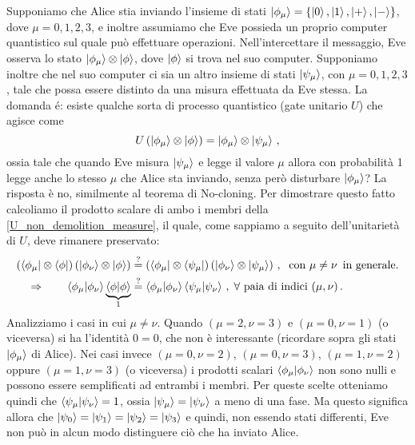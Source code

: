 \noindent Supponiamo che Alice stia inviando l'insieme di stati $\ket{\phi_\mu} = \{ \ket{0}, \ket{1}, \ket{+}, \ket{-} \}$, dove $\mu = 0, 1,2,3$, e inoltre assumiamo che Eve possieda un proprio computer quantistico sul quale può effettuare operazioni. Nell'intercettare il messaggio, Eve osserva lo stato $\ket{\phi_\mu} \otimes \ket{\phi}$, dove $\ket{\phi}$ si trova nel suo computer. Supponiamo inoltre che nel suo computer ci sia un altro insieme di stati $\ket{\psi_\mu}$, con $\mu = 0,1,2,3$, tale che possa essere distinto da una misura effettuata da Eve stessa. La domanda é: esiste qualche sorta di processo quantistico (gate unitario $U$) che agisce come
\begin{equation}\label{U_non_demolition_measure}
    U \left( \ket{\phi_\mu} \otimes \ket{\phi} \right) = \ket{\phi_\mu} \otimes \ket{\psi_\mu} \, ,
\end{equation}
ossia tale che quando Eve misura $\ket{\psi_\mu}$ e legge il valore $\mu$ allora con probabilità 1 legge anche lo stesso $\mu$ che Alice sta inviando, senza però disturbare $\ket{\phi_\mu}$? La risposta è no, similmente al teorema di No-cloning. Per dimostrare questo fatto calcoliamo il prodotto scalare di ambo i membri della \eqref{U_non_demolition_measure}, il quale, come sappiamo a seguito dell'unitarietà di $U$, deve rimanere preservato:
\begin{align*}
    \left( \bra{\phi_\mu} \otimes \bra{\phi} \right) \left( \ket{\phi_\nu} \otimes \ket{\phi} \right) &\overset{?}{=} \left( \bra{\phi_\mu} \otimes \bra{\psi_\mu} \right) \left( \ket{\phi_\nu} \otimes \ket{\psi_\mu} \right) \, , \; \text{ con } \mu \neq \nu \, \text{ in generale.} \\
    \Rightarrow \qquad \braket{\phi_\mu}{\phi_\nu} \underbrace{\braket{\phi}}_1 &\overset{?}{=} \braket{\phi_\mu}{\phi_\nu} \braket{\psi_\mu}{\psi_\nu} \, , \; \forall \text{ paia di indici } (\mu,\nu) \, .
\end{align*}
Analizziamo i casi in cui $\mu \neq \nu$. Quando $(\mu = 2, \nu = 3)$ e $(\mu = 0, \nu = 1)$ (o viceversa) si ha l'identità $0 = 0$, che non è interessante (ricordare sopra gli stati $\ket{\phi_\mu}$ di Alice). Nei casi invece $(\mu = 0, \nu = 2)$, $(\mu = 0, \nu = 3)$, $(\mu = 1, \nu = 2)$ oppure $(\mu = 1, \nu = 3)$ (o viceversa) i prodotti scalari $\braket{\phi_\mu}{\phi_\nu}$ non sono nulli e possono essere semplificati ad entrambi i membri. Per queste scelte otteniamo quindi che $\braket{\psi_\mu}{\psi_\nu} = 1$, ossia $\ket{\psi_\mu} = \ket{\psi_\nu}$ a meno di una fase. Ma questo significa allora che $\ket{\psi_0} = \ket{\psi_1} = \ket{\psi_2} = \ket{\psi_3}$ e quindi, non essendo stati differenti, Eve non può in alcun modo distinguere ciò che ha inviato Alice. 

